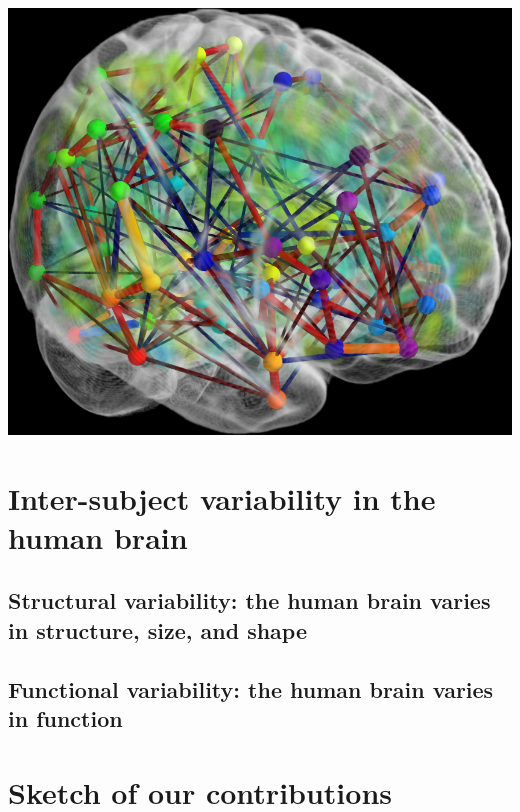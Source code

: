\begin{marginfigure}%
  \includegraphics[width=1\linewidth]{figures/connectome.png}
  \caption{...}
\end{marginfigure}


\section{Inter-subject variability in the human brain}
\subsection{Structural variability: the human brain varies in structure, size, and shape}
\subsection{Functional variability: the human brain varies in function}

\section{Sketch of our contributions}

  



